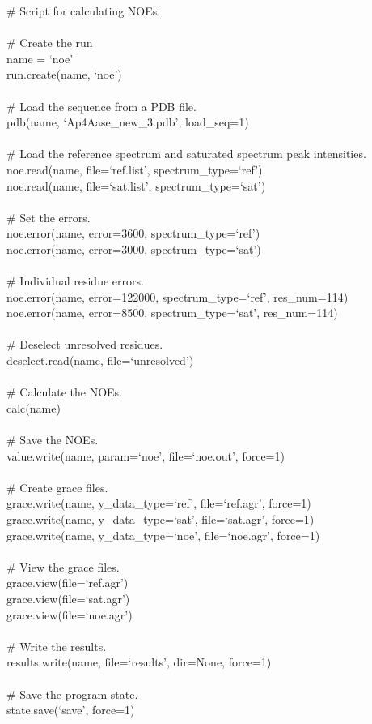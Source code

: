 \begin{exampleenv}
\# Script for calculating NOEs. \\
 \\
\# Create the run \\
name = `noe' \\
run.create(name, `noe') \\
 \\
\# Load the sequence from a PDB file. \\
pdb(name, `Ap4Aase\_new\_3.pdb', load\_seq=1) \\
 \\
\# Load the reference spectrum and saturated spectrum peak intensities. \\
noe.read(name, file=`ref.list', spectrum\_type=`ref') \\
noe.read(name, file=`sat.list', spectrum\_type=`sat') \\
 \\
\# Set the errors. \\
noe.error(name, error=3600, spectrum\_type=`ref') \\
noe.error(name, error=3000, spectrum\_type=`sat') \\
 \\
\# Individual residue errors. \\
noe.error(name, error=122000, spectrum\_type=`ref', res\_num=114) \\
noe.error(name, error=8500, spectrum\_type=`sat', res\_num=114) \\
 \\
\# Deselect unresolved residues. \\
deselect.read(name, file=`unresolved') \\
 \\
\# Calculate the NOEs. \\
calc(name) \\
 \\
\# Save the NOEs. \\
value.write(name, param=`noe', file=`noe.out', force=1) \\
 \\
\# Create grace files. \\
grace.write(name, y\_data\_type=`ref', file=`ref.agr', force=1) \\
grace.write(name, y\_data\_type=`sat', file=`sat.agr', force=1) \\
grace.write(name, y\_data\_type=`noe', file=`noe.agr', force=1) \\
 \\
\# View the grace files. \\
grace.view(file=`ref.agr') \\
grace.view(file=`sat.agr') \\
grace.view(file=`noe.agr') \\
 \\
\# Write the results. \\
results.write(name, file=`results', dir=None, force=1) \\
 \\
\# Save the program state. \\
state.save(`save', force=1)
\end{exampleenv}


